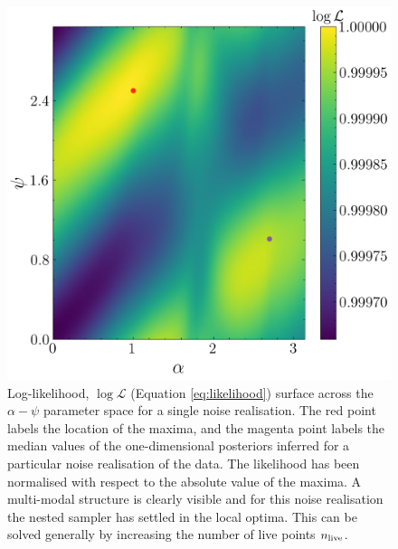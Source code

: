 \documentclass[fleqn,usenatbib,useAMS]{mnras}
\begin{document}
\begin{figure}
	\centering
	\includegraphics[width=\columnwidth]{images/likelihood_surface_alpha_psi}
	\caption{Log-likelihood, $\log \mathcal{L}$ (Equation \ref{eq:likelihood}) surface across the $\alpha-\psi$ parameter space for a single noise realisation.  The red point labels the location of the maxima, and the magenta point labels the median values of the one-dimensional posteriors inferred for a particular noise realisation of the data. The likelihood has been normalised with respect to the absolute value of the maxima. A multi-modal structure is clearly visible and for this noise realisation the nested sampler has settled in the local optima. This can be solved generally by increasing the number of live points $n_{\rm live}$.}
	\label{fig:likelihood_surface_alpha_psi}
\end{figure}
\end{document}

